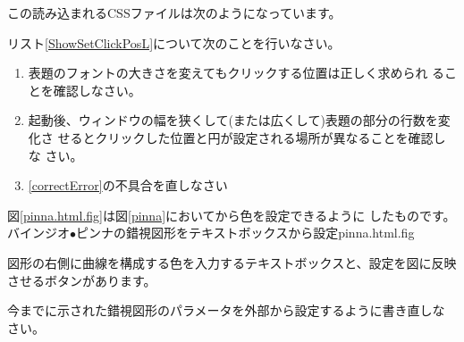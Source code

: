 この読み込まれるCSSファイルは次のようになっています。
\begin{Problem}\upshape
 リスト\ref{ShowSetClickPosL}について次のことを行いなさい。
\begin{enumerate}
 \item 表題のフォントの大きさを変えてもクリックする位置は正しく求められ
       ることを確認しなさい。
 \item 起動後、ウィンドウの幅を狭くして(または広くして)表題の部分の行数を変化さ
       せるとクリックした位置と円が設定される場所が異なることを確認しな
       さい。\label{correctError}
 \item \ref{correctError}の不具合を直しなさい
\end{enumerate}
\end{Problem}
図\ref{pinna.html.fig}は図\ref{pinna}において\HTML から色を設定できるように
したものです。
{バインジオ$\bullet$ピンナの錯視図形をテキストボックスから設定}{pinna.html.fig}

図形の右側に曲線を構成する色を入力するテキストボックスと、設定を図に反映
させるボタンがあります。

\begin{Problem}
 今までに示された錯視図形のパラメータを外部から設定するように書き直しな
 さい。
\end{Problem}